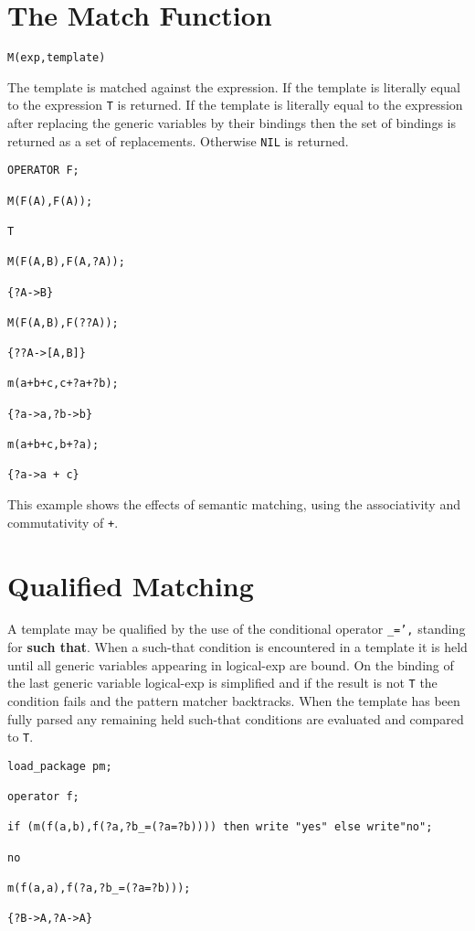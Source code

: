 \section{The Match Function}

{\tt M(exp,template)}

The template is matched against the expression.  If the template is
literally equal to the expression {\tt T} is returned.  If the
template is literally equal to the expression after replacing the
generic variables by their bindings then the set of bindings is
returned as a set of replacements.  Otherwise {\tt NIL} is returned.

\begin{verbatim}
OPERATOR F;

M(F(A),F(A));

T

M(F(A,B),F(A,?A));

{?A->B}

M(F(A,B),F(??A));

{??A->[A,B]}

m(a+b+c,c+?a+?b);

{?a->a,?b->b}

m(a+b+c,b+?a);

{?a->a + c}
\end{verbatim}

This example shows the effects of semantic matching, using the
associativity and commutativity of {\tt +}.

\section {Qualified Matching}

A template may be qualified by the use of the conditional operator
{\tt \_=',}\ttindex{\_=} standing for {\bf such that}.  When a
such-that condition is encountered in a template it is held until all
generic variables appearing in logical-exp are bound.  On the binding
of the last generic variable logical-exp is simplified and if the
result is not {\tt T} the condition fails and the pattern matcher
backtracks.  When the template has been fully parsed any remaining
held such-that conditions are evaluated and compared to {\tt T}.

\begin{verbatim}
load_package pm;

operator f;

if (m(f(a,b),f(?a,?b_=(?a=?b)))) then write "yes" else write"no";

no

m(f(a,a),f(?a,?b_=(?a=?b)));

{?B->A,?A->A}
\end{verbatim}
{}

